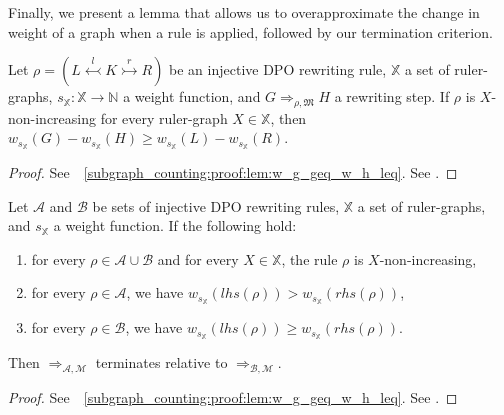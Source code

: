 Finally, we present a lemma that allows us to overapproximate the change in weight of a graph when a rule is applied, followed by our termination criterion. 

\begin{lemma}
    \label{subgraph_counting:lem:w_g_geq_w_h_leq}
    Let $\rho \mathop{=} (L \overset{l}{\leftarrowtail} K \overset{r}{\rightarrowtail} R)$ be an injective DPO rewriting rule,
    \( \mathbb{X} \) a set of ruler-graphs,
    \( s_{\mathbb{X}} \mathop{\colon} \mathbb{X} \mathop{\to} \mathbb{N} \) a weight function,
    and \( G \mathop{\Rightarrow}_{\rho,\mathfrak{M}} H \) a rewriting step. 
    If $\rho$ is \( X \)-non-increasing for every ruler-graph \( X \mathop{\in} \mathbb{X} \), then $
        w_{s_\mathbb{X}}(G) - w_{s_\mathbb{X}}(H) 
        \mathop{\geq} 
        w_{s_\mathbb{X}}(L) - w_{s_\mathbb{X}}(R)
    $.
\end{lemma}
\begin{proof}
    \iflongversion
        See~\textsection~\ref{subgraph_counting:proof:lem:w_g_geq_w_h_leq}.
    \else
        See \cite[Lemma 41]{qiu2025termination}.
    \fi 
\end{proof} 
\begin{theorem}[Termination] 
    \label{subgraph_counting:thm:termination_grs}
    Let \(\mathcal{A}\) and \(\mathcal{B}\) be sets of injective DPO rewriting rules, $\mathbb{X}$ a set of ruler-graphs, and $s_\mathbb{X}$ a weight function. If the following hold:
    \begin{enumerate}
        \item  for every $\rho \mathop{\in} \mathcal{A} \mathop{\cup} \mathcal{B}$ and for every $X \mathop{\in} \mathbb{X}$, the rule $\rho$ is $X$-non-increasing,
        \item for every \(\rho \mathop{\in} \mathcal{A}\), we have \( w_{s_\mathbb{X}}(lhs(\rho)) \mathop{>} w_{s_\mathbb{X}}(rhs(\rho)) \),
        \item for every \(\rho \mathop{\in} \mathcal{B}\), we have \( w_{s_\mathbb{X}}(lhs(\rho)) \mathop{\geq} w_{s_\mathbb{X}}(rhs(\rho)) \).
    \end{enumerate}
    Then \(\mathop{\Rightarrow}_{\mathcal{A},\mathcal{M}}\) terminates relative to \(\mathop{\Rightarrow}_{\mathcal{B},\mathcal{M}}\).
\end{theorem}
\begin{proof}
    \iflongversion
        See~\textsection~\ref{subgraph_counting:proof:lem:w_g_geq_w_h_leq}.
    \else
        See \cite[Lemma 41]{qiu2025termination}.
    \fi 
\end{proof} 